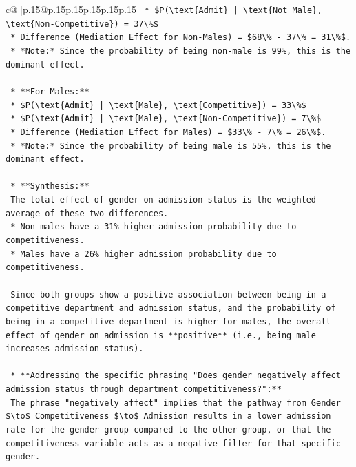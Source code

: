 \documentclass{article}
\begin{document}
{\begin{supertabular}{c@{$\;$}|p{.15\linewidth}@{}p{.15\linewidth}p{.15\linewidth}p{.15\linewidth}p{.15\linewidth}p{.15\linewidth}}
{{{\texttt{            *   \$P(\textbackslash{}text\{Admit\} | \textbackslash{}text\{Not Male\}, \textbackslash{}text\{Non{-}Competitive\}) = 37\textbackslash{}\%\$} \\
\texttt{            *   Difference (Mediation Effect for Non{-}Males) = \$68\textbackslash{}\% {-} 37\textbackslash{}\% = 31\textbackslash{}\%\$.} \\
\texttt{            *   *Note:* Since the probability of being non{-}male is 99\%, this is the dominant effect.} \\
\\ 
\texttt{        *   **For Males:**} \\
\texttt{            *   \$P(\textbackslash{}text\{Admit\} | \textbackslash{}text\{Male\}, \textbackslash{}text\{Competitive\}) = 33\textbackslash{}\%\$} \\
\texttt{            *   \$P(\textbackslash{}text\{Admit\} | \textbackslash{}text\{Male\}, \textbackslash{}text\{Non{-}Competitive\}) = 7\textbackslash{}\%\$} \\
\texttt{            *   Difference (Mediation Effect for Males) = \$33\textbackslash{}\% {-} 7\textbackslash{}\% = 26\textbackslash{}\%\$.} \\
\texttt{            *   *Note:* Since the probability of being male is 55\%, this is the dominant effect.} \\
\\ 
\texttt{    *   **Synthesis:**} \\
\texttt{        The total effect of gender on admission status is the weighted average of these two differences.} \\
\texttt{        *   Non{-}males have a 31\% higher admission probability due to competitiveness.} \\
\texttt{        *   Males have a 26\% higher admission probability due to competitiveness.} \\
\\ 
\texttt{        Since both groups show a positive association between being in a competitive department and admission status, and the probability of being in a competitive department is higher for males, the overall effect of gender on admission is **positive** (i.e., being male increases admission status).} \\
\\ 
\texttt{    *   **Addressing the specific phrasing "Does gender negatively affect admission status through department competitiveness?":**} \\
\texttt{        The phrase "negatively affect" implies that the pathway from Gender \$\textbackslash{}to\$ Competitiveness \$\textbackslash{}to\$ Admission results in a lower admission rate for the gender group compared to the other group, or that the competitiveness variable acts as a negative filter for that specific gender.} \\
}}}
\end{supertabular}}
\end{document}
